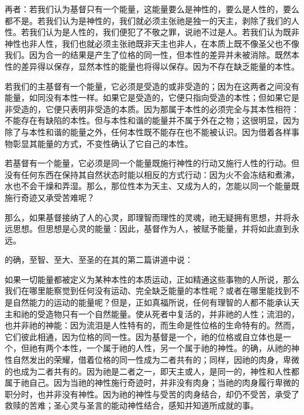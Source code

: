 再者：若我们认为基督只有一个能量，这能量要么是神性的，要么是人性的，要么都不是。若我们认为是神性的，我们就必须主张祂是独一的天主，剥除了我们的人性。若我们认为是人性的，我们便犯了不敬之罪，说祂不过是人。若我们认为既非神性也非人性，我们也就必须主张祂既非天主也非人，在本质上既不像圣父也不像我们。因为合一的结果是产生了位格的同一性，但本性的差异并未被消除。既然本性的差异得以保存，显然本性的能量也将得以保存。因为不存在缺乏能量的本性。\par

若我们的主基督有一个能量，它必须是受造的或非受造的；因为在这两者之间没有能量，如同没有本性一样。如果它是受造的，它便只指向受造的本性；但如果它是非受造的，它便只表明非受造的本质。因为那属于本性的必须完全与其本性相符：不能存在有缺陷的本性。但与本性和谐的能量并不属于外在之物；这很明显，因为除了与本性和谐的能量之外，任何本性既不能存在也不能被认识。因为借着各样事物彰显其能量的方式，不变性确认了它自己的本性。\par

若基督有一个能量，它必须是同一个能量既施行神性的行动又施行人性的行动。但没有任何东西在保持其自然状态时能以相反的方式行动：因为火不会冻结和煮沸，水也不会干燥和弄湿。那么，那位性本为天主、又成为人的，怎能以同一个能量既施行奇迹又承受苦难呢？\par

那么，如果基督接纳了人的心灵，即理智而理性的灵魂，祂无疑拥有思想，并将永远思想。但思想是心灵的能量：因此，基督作为人，被赋予能量，并将如此直到永远。\par

的确，至智、至大、至圣的在其的第二篇讲道中说：\par

如果一切能量都被定义为某种本性的本质运动，正如精通这些事物的人所说，那么我们在哪里能察觉到任何没有运动、完全缺乏能量的本性呢？或者在哪里能找到不是自然能力的运动的能量呢？但是，正如真福所说，任何有理智的人都不能承认天主和祂的受造物只有一个自然能量。使从死者中复活的，并非祂的人性；流泪的，也并非祂的神能：因为流泪是人性特有的，而生命是性位格的生命特有的。然而，它们彼此相通，因为位格的同一性。因为基督是一个，祂的位格或自立体也是一个，但祂有两个本性，一个属于祂的人性，另一个属于祂的神性。的确，从祂的神性自然发出的荣耀，借着位格的同一性成为二者共有的；同样，因祂的肉身，卑微的也成为二者共有的。因为祂是二者之一，即天主或人，是同一的，神性和人性都属于祂自己。因为当祂的神性施行奇迹时，并非没有肉身；当祂的肉身履行卑微的职分时，也并非没有神性。因为祂的神性与受苦的肉身结合，却仍不受苦，承受了救赎的苦难；圣心灵与圣言的能动神性结合，感知并知道所成就的事。\par

